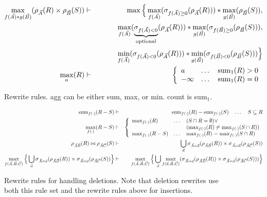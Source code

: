 \begin{figure*}
\begin{eqnarray}
\label{r11}
\\
\max_{f(\vec{A}) * g(\vec{B})}(\rho_{\vec{A}}(R) \times \rho_{\vec{B}}(S))
&\vdash&
\max\Big\{
\max_{f(\vec{A})}(\sigma_{f(\vec{A}) \ge 0}(\rho_{\vec{A}}(R))) *
\max_{g(\vec{B})}(\rho_{\vec{B}}(S)),
\nonumber\\
&& \quad\quad\;\;\,
\max_{f(\vec{A})}(\underbrace{\sigma_{f(\vec{A}) < 0}}_{\mathrm{optional}}(\rho_{\vec{A}}(R))) *
\max_{g(\vec{B})}(\sigma_{f(\vec{B}) \ge 0}(\rho_{\vec{B}}(S))),
\nonumber\\
&& \quad\quad\;\;\,
\min_{f(\vec{A})}(\sigma_{f(\vec{A}) < 0}(\rho_{\vec{A}}(R))) *
\min_{g(\vec{B})}(\sigma_{f(\vec{B}) < 0}(\rho_{\vec{B}}(S)))
\Big\}
\label{r12}
\\
\max_a(R)
&\vdash&
\left\{
\begin{array}{lll}
a       & \dots & \mathrm{sum}_1(R) > 0 \\
-\infty & \dots & \mathrm{sum}_1(R) = 0 \\
\end{array}
\right.
\label{r13}
\end{eqnarray}

\caption{Rewrite rules. agg can be either sum, max, or min.
count is sum$_1$.}
\label{fig:rules}
\end{figure*}



\begin{figure*}
\begin{eqnarray}
\mathrm{sum}_{f(\cdot)}(R - S)
& \vdash &
\mathrm{sum}_{f(\cdot)}(R) -
\mathrm{sum}_{f(\cdot)}(S) \quad \dots \quad S \subseteq R
\label{r20}
\\
\max_{f(\cdot)}(R - S)
& \vdash &
\left\{\begin{array}{lll}
\max_{f(\cdot)}(R) & \dots & (S \cap R = \emptyset) \vee \\
& &  (\max_{f(\cdot)}(R) \neq
\max_{f(\cdot)}(S \cap R)) \\
\max_{f(\cdot)}(R
- S) & \dots &  \max_{f(\cdot)}(R) = \max_{f(\cdot)}(S \cap R) \\
\end{array}\right.
\label{r21}
\\
\rho_{\vec{A}\vec{B}}(R) \bowtie \rho_{\vec{A}\vec{C}}(S)
& \vdash &
\bigcup_{\vec{a}}
\sigma_{\vec{A}=\vec{a}}(\rho_{\vec{A}\vec{B}}(R))
\times \sigma_{\vec{A}=\vec{a}}(\rho_{\vec{A}\vec{C}}(S))
\label{r23}
\\
\max_{f(\vec{A},\vec{B},\vec{C})} \Big\{
\bigcup_{\vec{a}}
\sigma_{\vec{A}=\vec{a}}(\rho_{\vec{A}\vec{B}}(R)) \times
\sigma_{\vec{A}=\vec{a}}(\rho_{\vec{A}\vec{C}}(S)) \Big\}
& \vdash &
\max_{f(\vec{A},\vec{B},\vec{C})}\Big\{
\bigcup_{\vec{a}} \max_{f(\vec{a},\vec{B},\vec{C})}
(\sigma_{\vec{A}=\vec{a}}(\rho_{\vec{A}\vec{B}}(R)) \times
\sigma_{\vec{A}=\vec{a}}(\rho_{\vec{A}\vec{C}}(S))) 
\Big\}
\label{r24}
\end{eqnarray}
\caption{Rewrite rules for handling deletions. Note that deletion rewrites use
both this rule set and the rewrite rules above for insertions.}
\label{fig:deleterules}
\end{figure*}





